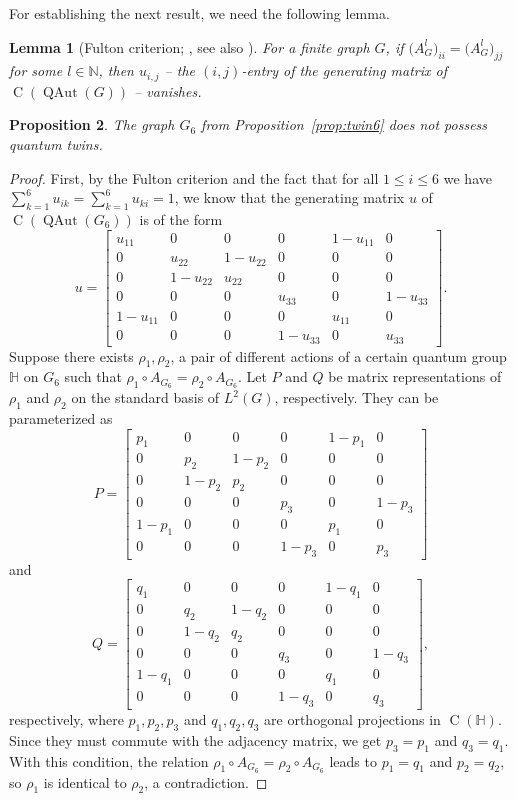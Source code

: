 \documentclass[11pt,reqno]{amsart}
\newtheorem{proposition}{Proposition}[section]
\newtheorem{lemma}[proposition]{Lemma}
\DeclareMathOperator{\QAut}{QAut}
\DeclareMathOperator{\C}{C}
\begin{document}
For establishing the next result, we need the following lemma.
\begin{lemma}[{Fulton criterion; \cite{Fulton}, see also \cite[Lemma 2.6]{Weber22}}] For a finite graph $G$, if $\bigl(A_{\scriptscriptstyle G}^l\bigr)_{ii}=\bigl(A_{\scriptscriptstyle G}^{l}\bigr)_{jj}$ for some $l\in\mathbb{N}$, then $u_{i,j}$ -- the $(i,j)$-entry of the generating matrix of $\C(\QAut(G))$ -- vanishes.
\end{lemma}

\begin{proposition}
The graph $G_6$ from Proposition~\ref{prop:twin6} does not possess quantum twins.
\end{proposition}

\begin{proof}
First, by the Fulton criterion and the fact that for all $1\leq i\leq 6$ we have $\sum\limits_{k=1}^{6} u_{ik}=\sum\limits_{k=1}^6 u_{ki}=1$, we know that the generating matrix $u$ of $\C(\QAut(G_6))$ is of the form
\[
u=\begin{bmatrix}
u_{11} & 0 & 0 &0 & 1-u_{11} & 0\\
0 & u_{22} & 1-u_{22} & 0 &0 &0\\
0 & 1-u_{22} & u_{22} & 0 &0&0\\
0&0&0& u_{33} & 0 & 1-u_{33}\\
1-u_{11} & 0 &0 &0& u_{11} & 0\\
0&0&0&1-u_{33}&0&u_{33}
\end{bmatrix}.
\]
Suppose there exists $\rho_1,\rho_2$, a pair of different actions of a certain quantum group $\mathbb{H}$ on $G_6$ such that $\rho_1\circ A_{\scriptscriptstyle G_6}=\rho_2\circ A_{\scriptscriptstyle G_6}$. Let $P$ and $Q$ be matrix representations of $\rho_1$ and $\rho_2$ on the standard basis of $L^2(G)$, respectively. They can be parameterized as
\[
P=\begin{bmatrix}
p_1 & 0 & 0 &0 & 1-p_1 & 0\\
0 & p_2 & 1-p_2 & 0 &0 &0\\
0 & 1-p_2 & p_2 & 0 &0&0\\
0&0&0& p_3 & 0 & 1-p_3\\
1-p_1 & 0 &0 &0& p_1 & 0\\
0&0&0&1-p_3&0&p_3
\end{bmatrix}
\]
and
\[
Q=\begin{bmatrix}
q_1 & 0 & 0 &0 & 1-q_1 & 0\\
0 & q_2 & 1-q_2 & 0 &0 &0\\
0 & 1-q_2 & q_2 & 0 &0&0\\
0&0&0& q_3 & 0 & 1-q_3\\
1-q_1 & 0 &0 &0& q_1 & 0\\
0&0&0&1-q_3&0&q_3
\end{bmatrix},
\]
respectively, where $p_1,p_2,p_3$ and $q_1,q_2,q_3$ are orthogonal projections in $\C(\mathbb{H})$. Since they must commute with the adjacency matrix, we get $p_3=p_1$ and $q_3=q_1$. With this condition, the relation $\rho_1\circ A_{\scriptscriptstyle G_6}=\rho_2\circ A_{\scriptscriptstyle G_6}$ leads to $p_1=q_1$ and $p_2=q_2$, so $\rho_1$ is identical to $\rho_2$, a contradiction.
\end{proof}
\end{document}
